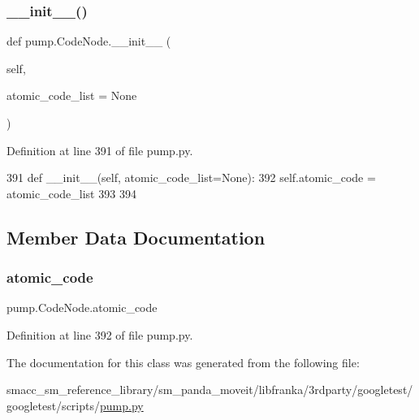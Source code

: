 \subsubsection{\texorpdfstring{\+\_\+\+\_\+init\+\_\+\+\_\+()}{\_\_init\_\_()}}
{\footnotesize\ttfamily def pump.\+Code\+Node.\+\_\+\+\_\+init\+\_\+\+\_\+ (\begin{DoxyParamCaption}\item[{}]{self,  }\item[{}]{atomic\+\_\+code\+\_\+list = {\ttfamily None} }\end{DoxyParamCaption})}



Definition at line 391 of file pump.\+py.


\begin{DoxyCode}
391   \textcolor{keyword}{def }\_\_init\_\_(self, atomic\_code\_list=None):
392     self.atomic\_code = atomic\_code\_list
393 
394 
\end{DoxyCode}


\subsection{Member Data Documentation}
\mbox{\label{classpump_1_1CodeNode_ac7251110cc987c709e0e17d95521993e}} 
\subsubsection{\texorpdfstring{atomic\+\_\+code}{atomic\_code}}
{\footnotesize\ttfamily pump.\+Code\+Node.\+atomic\+\_\+code}



Definition at line 392 of file pump.\+py.



The documentation for this class was generated from the following file\+:\begin{DoxyCompactItemize}
\item 
smacc\+\_\+sm\+\_\+reference\+\_\+library/sm\+\_\+panda\+\_\+moveit/libfranka/3rdparty/googletest/googletest/scripts/\hyperlink{pump_8py}{pump.\+py}\end{DoxyCompactItemize}

